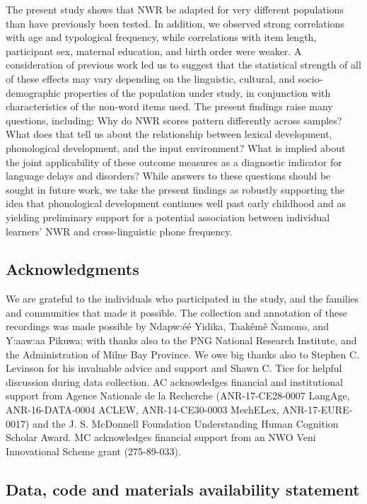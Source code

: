 \documentclass[
  english,
  ,man,floatsintext]{apa6}
\begin{document}
The present study shows that NWR be adapted for very different populations than have previously been tested. In addition, we observed strong correlations with age and typological frequency, while correlations with item length, participant sex, maternal education, and birth order were weaker. A consideration of previous work led us to suggest that the statistical strength of all of these effects may vary depending on the linguistic, cultural, and socio-demographic properties of the population under study, in conjunction with characteristics of the non-word items used. The present findings raise many questions, including: Why do NWR scores pattern differently across samples? What does that tell us about the relationship between lexical development, phonological development, and the input environment? What is implied about the joint applicability of these outcome measures as a diagnostic indicator for language delays and disorders? While answers to these questions should be sought in future work, we take the present findings as robustly supporting the idea that phonological development continues well past early childhood and as yielding preliminary support for a potential association between individual learners' NWR and cross-linguistic phone frequency.

\newpage

\hypertarget{acknowledgments}{%
\subsection{Acknowledgments}\label{acknowledgments}}

We are grateful to the individuals who participated in the study, and the families and communities that made it possible. The collection and annotation of these recordings was made possible by Ndapw:éé Yidika, Taakêmê Ńamono, and Y:aaw:aa Pikuwa; with thanks also to the PNG National Research Institute, and the Administration of Milne Bay Province. We owe big thanks also to Stephen C. Levinson for his invaluable advice and support and Shawn C. Tice for helpful discussion during data collection. AC acknowledges financial and institutional support from Agence Nationale de la Recherche (ANR-17-CE28-0007 LangAge, ANR-16-DATA-0004 ACLEW, ANR-14-CE30-0003 MechELex, ANR-17-EURE-0017) and the J. S. McDonnell Foundation Understanding Human Cognition Scholar Award. MC acknowledges financial support from an NWO Veni Innovational Scheme grant (275-89-033).

\hypertarget{data-code-and-materials-availability-statement}{%
\subsection{Data, code and materials availability statement}\label{data-code-and-materials-availability-statement}}
\end{document}
